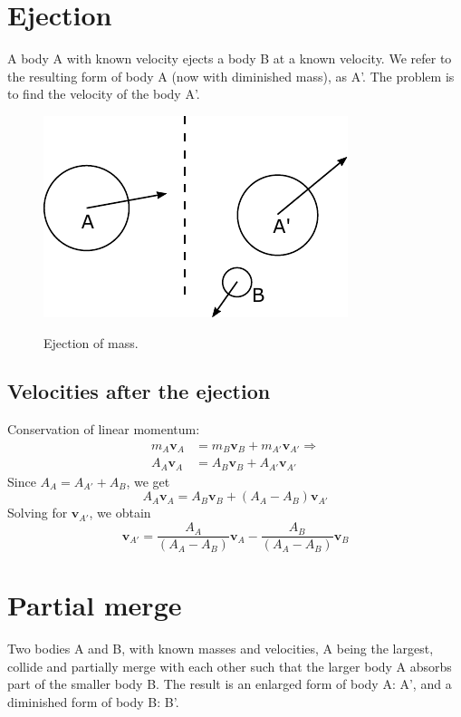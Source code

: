 \documentclass{article}
\newcommand{\vbs}[0]{\boldsymbol{v}}
\begin{document}
\section{Ejection}
A body A with known velocity ejects a body B at a known velocity. We refer to the resulting form of body A (now with diminished mass), as A'. The problem is to find the velocity of the body A'.

\begin{figure}[h]
	\centering
	{\includegraphics{figures/ejection.pdf}}
	\caption{Ejection of mass.}\label{fig:ejection}
\end{figure}

\subsection{Velocities after the ejection}

Conservation of linear momentum:
\begin{equation*}
\begin{split}
m_A\vbs_A &= m_B\vbs_B + m_{A'}\vbs_{A'}
\Rightarrow
\\A_A\vbs_A &= A_B\vbs_B + A_{A'}\vbs_{A'}
\end{split}
\end{equation*}
Since $A_A = A_{A'} + A_B$, we get
\begin{equation*}
A_A\vbs_A = A_B\vbs_B + (A_A - A_B)\vbs_{A'}
\end{equation*}
Solving for $\vbs_{A'}$, we obtain
\begin{equation}
\vbs_{A'} = \frac{A_A}{(A_A - A_B)}\vbs_A - \frac{A_B}{(A_A - A_B)}\vbs_B
\end{equation}







\section{Partial merge}
Two bodies A and B, with known masses and velocities, A being the largest, collide and partially merge with each other such that the larger body A absorbs part of the smaller body B. The result is an enlarged form of body A: A', and a diminished form of body B: B'.
\end{document}

